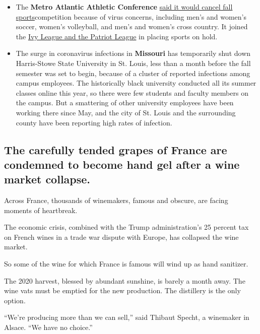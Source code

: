 \begin{itemize}
\item
  The \textbf{Metro Atlantic Athletic Conference}
  \href{https://maacsports.com/news/2020/7/27/general-maac-statement-of-fall-sports-competition.aspx}{said
  it would cancel fall sports}competition because of virus concerns,
  including men's and women's soccer, women's volleyball, and men's and
  women's cross country. It joined the
  \href{https://www.nytimes3xbfgragh.onion/2020/07/08/sports/ncaafootball/ivy-league-fall-sports-football-coronavirus.html}{Ivy
  League and the Patriot League} in placing sports on hold.
\item
  The surge in coronavirus infections in \textbf{Missouri} has
  temporarily shut down Harris-Stowe State University in St. Louis, less
  than a month before the fall semester was set to begin, because of a
  cluster of reported infections among campus employees. The
  historically black university conducted all its summer classes online
  this year, so there were few students and faculty members on the
  campus. But a smattering of other university employees have been
  working there since May, and the city of St. Louis and the surrounding
  county have been reporting high rates of infection.
\end{itemize}

\hypertarget{the-carefully-tended-grapes-of-france-are-condemned-to-become-hand-gel-after-a-wine-market-collapse}{%
\subsection{The carefully tended grapes of France are condemned to
become hand gel after a wine market
collapse.}\label{the-carefully-tended-grapes-of-france-are-condemned-to-become-hand-gel-after-a-wine-market-collapse}}

Across France, thousands of winemakers, famous and obscure, are facing
moments of heartbreak.

The economic crisis, combined with the Trump administration's 25 percent
tax on French wines in a trade war dispute with Europe, has collapsed
the wine market.

So some of the wine for which France is famous will wind up as hand
sanitizer.

The 2020 harvest, blessed by abundant sunshine, is barely a month away.
The wine vats must be emptied for the new production. The distillery is
the only option.

``We're producing more than we can sell,'' said Thibaut Specht, a
winemaker in Alsace. ``We have no choice.''

